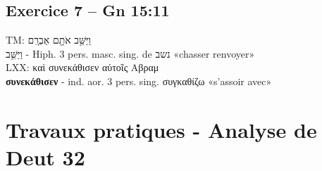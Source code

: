 \documentclass[11pt,a4paper]{article}
\begin{document}
\subsection*{Exercice 7 – Gn 15:11}
TM: \texthebrew{וַיַּשֵּׁ֥ב אֹתָ֖ם אַבְרָֽם} \\
\texthebrew{וַיַּשֵּׁ֥ב} - Hiph. 3 pers. masc. sing. de \texthebrew{נשב} «chasser renvoyer» \\
LXX: \textgreek{καὶ συνεκάθισεν αὐτοῖς Αβραμ} \\
\textbf{συνεκάθισεν} - ind. aor. 3 pers. sing. \textgreek{συγκαθίζω} «s’assoir avec» \\

\newpage
\section{Travaux pratiques - Analyse de Deut 32}
\end{document}
